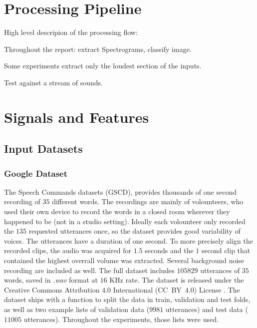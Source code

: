 
\section{Processing Pipeline}
\label{sec:processing_architecture}

High level descripion of the processing flow:

Throughout the report: extract Spectrograms, classify image.

Some experiments extract only the loudest section of the inputs.

Test against a stream of sounds.

\section{Signals and Features}
\label{sec:model}

\subsection{Input Datasets}

\subsubsection{Google Dataset}


The Speech Commands datasets \cite{warden2018speech} (GSCD), provides thousands
of one second recording of $35$ different words. The recordings are mainly of
volounteers, who used their own device to record the words in a closed room
wherever they happened to be (not in a studio setting). Ideally each volounteer
only recorded the $135$ requested utterances once, so the dataset provides good
variability of voices.
The utterances have a duration of one second.
To more precisely align the recorded clips, the audio was acquired for $1.5$
seconds and the $1$ second clip that contained the highest overrall volume was
extracted.
Several background noise recording are included as well.
The full dataset includes $105829$ utterances of $35$ words, saved in
\textit{.wav} format at $16$ KHz rate.
The dataset is released under the Creative Commons Attribution $4.0$
International (CC~BY~$4.0$) License \cite{ccby4}.
The dataset ships with a function to split the data in train, validation and
test folds, as well as two example lists of validation data ($9981$ utterances)
and test data ($11005$ utterances).
Throughout the experiments, those lists were used.

